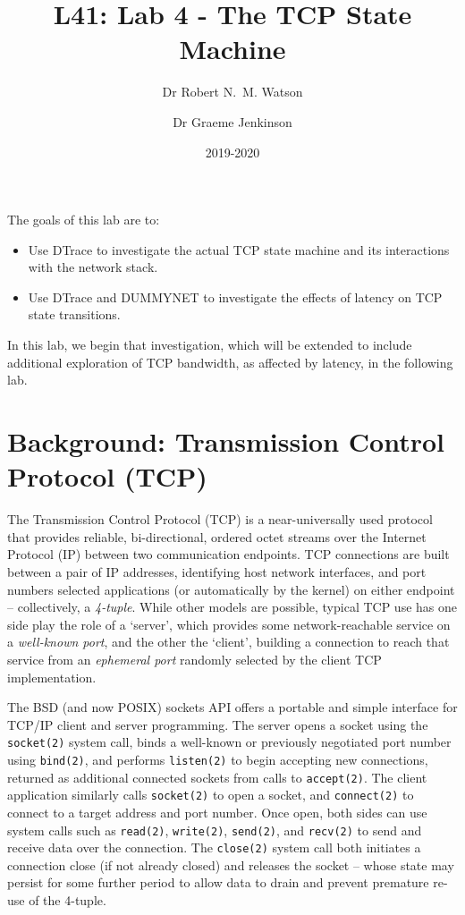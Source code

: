 \documentclass[a4paper,10pt]{article}
\begin{document}
\title{L41: Lab 4 - The TCP State Machine}
\author{Dr Robert N.~M. Watson \and Dr Graeme Jenkinson}
\date{2019-2020}
\maketitle

\noindent
The goals of this lab are to:

\begin{itemize}
\item Use DTrace to investigate the actual TCP state machine and its
  interactions with the network stack.
\item Use DTrace and DUMMYNET to investigate the effects of latency on TCP
  state transitions.
\end{itemize}

\noindent
In this lab, we begin that investigation, which will be extended to include
additional exploration of TCP bandwidth, as affected by latency, in the
following lab.

\section*{Background: Transmission Control Protocol (TCP)}

The Transmission Control Protocol (TCP) is a near-universally used protocol
that provides reliable, bi-directional, ordered octet streams over the Internet
Protocol (IP) between two communication endpoints.
TCP connections are built between a pair of IP addresses, identifying host
network interfaces, and port numbers selected applications (or automatically
by the kernel) on either endpoint -- collectively, a \textit{4-tuple}.
While other models are possible, typical TCP use has one side play the role of
a `server', which provides some network-reachable service on a
\textit{well-known port}, and the other the `client', building a connection to
reach that service from an \textit{ephemeral port} randomly selected by the
client TCP implementation.

The BSD (and now POSIX) sockets API offers a portable and simple interface for
TCP/IP client and server programming.
The server opens a socket using the \texttt{socket(2)} system call, binds a
well-known or previously negotiated port number using \texttt{bind(2)}, and
performs \texttt{listen(2)} to begin accepting new connections, returned as
additional connected sockets from calls to \texttt{accept(2)}.
The client application similarly calls \texttt{socket(2)} to open a socket,
and \texttt{connect(2)} to connect to a target address and port number.
Once open, both sides can use system calls such as \texttt{read(2)},
\texttt{write(2)}, \texttt{send(2)}, and \texttt{recv(2)} to send and receive
data over the connection.
The \texttt{close(2)} system call both initiates a connection close (if not
already closed) and releases the socket -- whose state may persist for some
further period to allow data to drain and prevent premature re-use of the
4-tuple.
\end{document}
